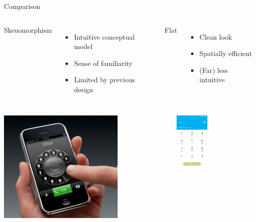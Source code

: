 \documentclass{beamer}
\begin{document}
\begin{frame}{Comparison}
    \begin{columns}[c]
            Skeuomorphism
            \begin{itemize}
                \item Intuitive conceptual model
                \item Sense of familiarity
                \item Limited by previous design
            \end{itemize}
            Flat
            \begin{itemize}
                \item Clean look
                \item Spatially efficient
                \item (Far) less intuitive
            \end{itemize}
    \end{columns}
    \begin{columns}[c]
                    \begin{center}
                    \includegraphics[width=0.7\textwidth]{idial.jpg}
                    \end{center}
                    \begin{center}
                    \includegraphics[width=0.4\textwidth]{dial-flat.png}

\end{center}
\end{columns}
\end{frame}
\end{document}
